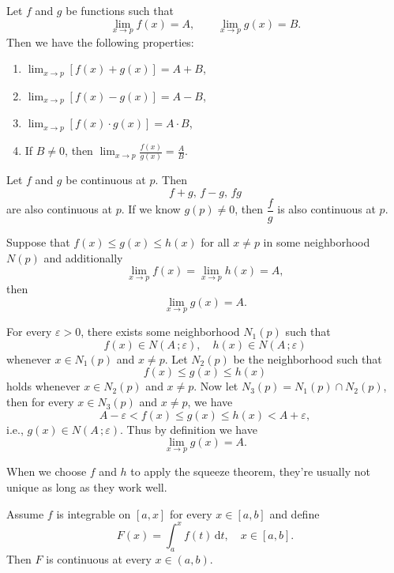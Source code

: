 	\begin{theoremenv}
		Let $f$ and $g$ be functions such that 
		\[
		\lim_{x\to p} f(x)=A,\qquad \lim_{x\to p} g(x)=B.
		\]
		Then we have the following properties:
		\begin{enumerate}
			\item $\displaystyle \lim_{x\to p} [f(x)+g(x)]=A+B$,
			\item $\displaystyle \lim_{x\to p} [f(x)-g(x)]=A-B$,
			\item $\displaystyle \lim_{x\to p} [f(x)\cdot g(x)]=A\cdot B$,
			\item If $B\neq 0$, then $\displaystyle \lim_{x\to p} \frac{f(x)}{g(x)}=\frac{A}{B}$.
		\end{enumerate}
	\end{theoremenv}
	\begin{theoremenv}
		Let $f$ and $g$ be continuous at $p$. Then \[f+g,\, f-g,\, fg \] are also continuous at $p$. If we know $g(p)\neq 0$, then $\dfrac{f}{g}$ is also continuous at $p$.
	\end{theoremenv}
	\begin{theoremenv}
		Suppose that $f(x)\le g(x)\le h(x)$ for all $x\neq p$ in some neighborhood $N(p)$ and additionally
		\[
		\lim_{x\to p} f(x)=\lim_{x\to p} h(x)=A,
		\]
		then
		\[
		\lim_{x\to p} g(x)=A.
		\]
		
	\end{theoremenv}
	\begin{proofenv}
		For every $\varepsilon>0$, there exists some neighborhood $N_1(p)$ such that
		\[
		f(x)\in N(A\,;\varepsilon),\quad h(x)\in N(A\,;\varepsilon)
		\]
		whenever $x\in N_1(p)$ and $x\neq p$. Let $N_2(p)$ be the neighborhood such that
		\[
		f(x)\le g(x)\le h(x)
		\]
		holds whenever $x\in N_2(p)$ and $x\neq p$. Now let $N_3(p)=N_1(p)\cap N_2(p)$, then for every $x\in N_3(p)$ and $x\neq p$, we have
		\[
		A-\varepsilon < f(x) \le g(x) \le h(x) < A+\varepsilon,
		\]
		i.e., $g(x)\in N(A\,;\varepsilon)$. Thus by definition we have
		\[
		\lim_{x\to p} g(x)=A.
		\]
	\end{proofenv}
	\begin{remarkenv}
		When we choose $f$ and $h$ to apply the squeeze theorem, they're usually not unique as long as they work well.
	\end{remarkenv}
	\begin{theoremenv}
		Assume $f$ is integrable on $[a,x]$ for every $x\in [a,b]$ and define
		\[
		F(x)=\int_a^x f(t)\,\mathrm{d}t,\quad x\in[a,b].
		\]
		Then $F$ is continuous at every $x\in(a,b)$.
	\end{theoremenv}
